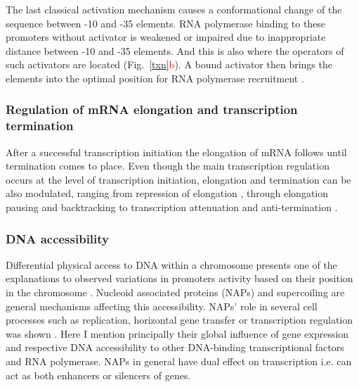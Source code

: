 The last classical activation mechanism causes a conformational change of the sequence between -10 and -35 elements.
RNA polymerase binding to these promoters without activator is weakened or impaired due to inappropriate distance between -10 and -35 elements.
And this is also where the operators of such activators are located (Fig.~\ref{txn}\textcolor{red}{b}).
A bound activator then brings the elements into the optimal position for RNA polymerase recruitment \cite{heldwein2001crystal}.


\subsubsection{Regulation of mRNA elongation and transcription termination}
After a successful transcription initiation the elongation of mRNA follows until termination comes to place.
Even though the main transcription regulation occurs at the level of transcription initiation, elongation and termination can be also modulated, ranging from repression of elongation \cite{monsalve1996protein}, through elongation pausing and backtracking \cite{mustaev2017transcription} to transcription attenuation and anti-termination \cite{naville2009transcription}.

\subsubsection{DNA accessibility}
Differential physical access to DNA within a chromosome presents one of the explanations to observed variations in promoters activity based on their position in the chromosome \cite{bryant2014chromosome}.
Nucleoid associated proteins (NAPs) and supercoiling are general mechanisms affecting this accessibility.
NAPs' role in several cell processes such as replication, horizontal gene transfer or transcription regulation was shown \cite{dixon1984protein, kayoko1992histone, aznar2013hha}.
Here I mention principally their global influence of gene expression and respective DNA accessibility to other DNA-binding transcriptional factors and RNA polymerase.
NAPs in general have dual effect on transcription i.e. can act as both enhancers or silencers of genes.

